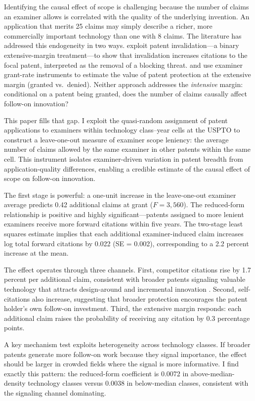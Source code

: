 \documentclass[12pt]{article}
\begin{document}
Identifying the causal effect of scope is challenging because the number of claims an examiner allows is correlated with the quality of the underlying invention. An application that merits 25 claims may simply describe a richer, more commercially important technology than one with 8 claims. The literature has addressed this endogeneity in two ways. \citet{galasso2015} exploit patent invalidation---a binary extensive-margin treatment---to show that invalidation increases citations to the focal patent, interpreted as the removal of a blocking threat. \citet{sampat2019} and \citet{farre2020} use examiner grant-rate instruments to estimate the value of patent protection at the extensive margin (granted vs.\ denied). Neither approach addresses the \emph{intensive} margin: conditional on a patent being granted, does the number of claims causally affect follow-on innovation?

This paper fills that gap. I exploit the quasi-random assignment of patent applications to examiners within technology class--year cells at the USPTO to construct a leave-one-out measure of examiner scope leniency: the average number of claims allowed by the same examiner in other patents within the same cell. This instrument isolates examiner-driven variation in patent breadth from application-quality differences, enabling a credible estimate of the causal effect of scope on follow-on innovation.

The first stage is powerful: a one-unit increase in the leave-one-out examiner average predicts 0.42 additional claims at grant ($F = 3{,}560$). The reduced-form relationship is positive and highly significant---patents assigned to more lenient examiners receive more forward citations within five years. The two-stage least squares estimate implies that each additional examiner-induced claim increases log total forward citations by 0.022 (SE = 0.002), corresponding to a 2.2 percent increase at the mean.

The effect operates through three channels. First, competitor citations rise by 1.7 percent per additional claim, consistent with broader patents signaling valuable technology that attracts design-around and incremental innovation \citep{scotchmer1991}. Second, self-citations also increase, suggesting that broader protection encourages the patent holder's own follow-on investment. Third, the extensive margin responds: each additional claim raises the probability of receiving any citation by 0.3 percentage points.

A key mechanism test exploits heterogeneity across technology classes. If broader patents generate more follow-on work because they signal importance, the effect should be larger in crowded fields where the signal is more informative. I find exactly this pattern: the reduced-form coefficient is 0.0072 in above-median-density technology classes versus 0.0038 in below-median classes, consistent with the signaling channel dominating.
\end{document}
